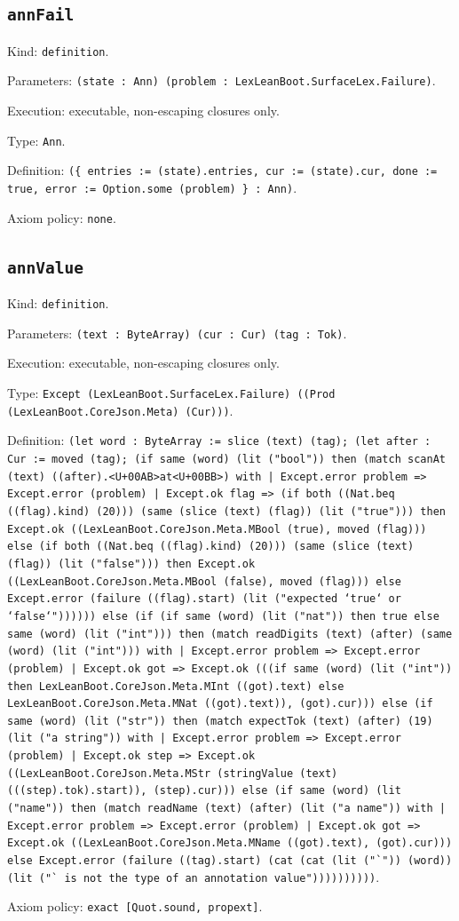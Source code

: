 \documentclass[11pt]{article}
\begin{document}
\subsection*{\texttt{annFail}}
\noindent Kind: \texttt{definition}.\par
\noindent Parameters: \texttt{(state : Ann) (problem : LexLeanBoot.SurfaceLex.Failure)}.\par
\noindent Execution: executable, non-escaping closures only.\par
\noindent Type: \texttt{Ann}.\par
\noindent Definition: \texttt{(\{ entries := (state).entries, cur := (state).cur, done := true, error := Option.some (problem) \} : Ann)}.\par
\noindent Axiom policy: \texttt{none}.\par
\subsection*{\texttt{annValue}}
\noindent Kind: \texttt{definition}.\par
\noindent Parameters: \texttt{(text : ByteArray) (cur : Cur) (tag : Tok)}.\par
\noindent Execution: executable, non-escaping closures only.\par
\noindent Type: \texttt{Except (LexLeanBoot.SurfaceLex.Failure) ((Prod (LexLeanBoot.CoreJson.Meta) (Cur)))}.\par
\noindent Definition: \texttt{(let word : ByteArray := slice (text) (tag); (let after : Cur := moved (tag); (if same (word) (lit ("bool")) then (match scanAt (text) ((after).<U+00AB>at<U+00BB>) with | Except.error problem => Except.error (problem) | Except.ok flag => (if both ((Nat.beq ((flag).kind) (20))) (same (slice (text) (flag)) (lit ("true"))) then Except.ok ((LexLeanBoot.CoreJson.Meta.MBool (true), moved (flag))) else (if both ((Nat.beq ((flag).kind) (20))) (same (slice (text) (flag)) (lit ("false"))) then Except.ok ((LexLeanBoot.CoreJson.Meta.MBool (false), moved (flag))) else Except.error (failure ((flag).start) (lit ("expected `true` or `false`")))))) else (if (if same (word) (lit ("nat")) then true else same (word) (lit ("int"))) then (match readDigits (text) (after) (same (word) (lit ("int"))) with | Except.error problem => Except.error (problem) | Except.ok got => Except.ok (((if same (word) (lit ("int")) then LexLeanBoot.CoreJson.Meta.MInt ((got).text) else LexLeanBoot.CoreJson.Meta.MNat ((got).text)), (got).cur))) else (if same (word) (lit ("str")) then (match expectTok (text) (after) (19) (lit ("a string")) with | Except.error problem => Except.error (problem) | Except.ok step => Except.ok ((LexLeanBoot.CoreJson.Meta.MStr (stringValue (text) (((step).tok).start)), (step).cur))) else (if same (word) (lit ("name")) then (match readName (text) (after) (lit ("a name")) with | Except.error problem => Except.error (problem) | Except.ok got => Except.ok ((LexLeanBoot.CoreJson.Meta.MName ((got).text), (got).cur))) else Except.error (failure ((tag).start) (cat (cat (lit ("`")) (word)) (lit ("` is not the type of an annotation value"))))))))))}.\par
\noindent Axiom policy: \texttt{exact [Quot.sound, propext]}.\par
\end{document}
